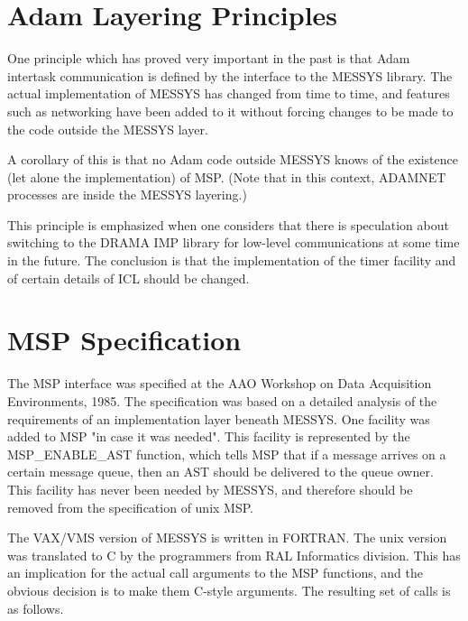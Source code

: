 \section {Adam Layering Principles}

One principle which has proved very important in the past is that Adam 
intertask communication is defined by the interface to the MESSYS 
library. The actual implementation of MESSYS has changed from time to 
time, and features such as networking have been added to it without 
forcing changes to be made to the code outside the MESSYS layer.

A corollary of this is that no Adam code outside MESSYS knows of the 
existence (let alone the implementation) of MSP. (Note that in this 
context, ADAMNET processes are inside the MESSYS layering.)

This principle is emphasized when one considers that there is 
speculation about switching to the DRAMA IMP library for low-level 
communications at some time in the future. The conclusion is that the 
implementation of the timer facility and of certain details of ICL 
should be changed.


\section {MSP Specification}

The MSP interface was specified at the AAO Workshop on Data Acquisition 
Environments, 1985. The specification was based on a detailed analysis 
of the requirements of an implementation layer beneath MESSYS. One 
facility was added to MSP "in case it was needed". This facility is 
represented by the MSP\_ENABLE\_AST function, which tells MSP that if a 
message arrives on a certain message queue, then an AST should be 
delivered to the queue owner. This facility has never been needed by 
MESSYS, and therefore should be removed from the specification of unix 
MSP.

The VAX/VMS version of MESSYS is written in FORTRAN. The unix version 
was translated to C by the programmers from RAL Informatics division. 
This has an implication for the actual call arguments to the MSP 
functions, and the obvious decision is to make them C-style arguments. 
The resulting set of calls is as follows.

